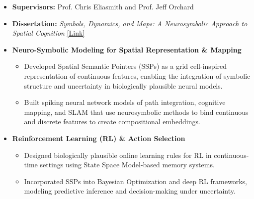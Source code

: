 \documentclass[11pt,a4paper,ragged2e,academicons]{altacv}
\begin{document}
\begin{fullwidth}
\begin{itemize}
\item \textbf{Supervisors:} Prof. Chris Eliasmith and Prof. Jeff Orchard
\item \textbf{Dissertation:} \emph{Symbols, Dynamics, and Maps: A Neurosymbolic Approach to Spatial Cognition} \href{https://hdl.handle.net/10012/21501}{[Link]}
    \item \textbf{Neuro-Symbolic Modeling for Spatial Representation \& Mapping}
\begin{itemize}\setlength\itemsep{0em}
        \item Developed Spatial Semantic Pointers (SSPs) as a grid cell-inspired representation of continuous features, enabling the integration of symbolic structure and uncertainty in biologically plausible neural models.
        \item Built spiking neural network models of path integration, cognitive mapping, and SLAM that use neurosymbolic methods to bind continuous and discrete features to create compositional embeddings. %
     \end{itemize}
\item \textbf{Reinforcement Learning (RL) \& Action Selection}
\begin{itemize}\setlength\itemsep{0em}
\item Designed biologically plausible online learning rules for RL in continuous-time settings using State Space Model-based memory systems.
\item Incorporated SSPs into Bayesian Optimization and deep RL frameworks, modeling predictive inference and decision-making under uncertainty.


    \end{itemize}
 \end{itemize}
 \vspace{-2pt}
\divider


\end{fullwidth}
\end{document}

